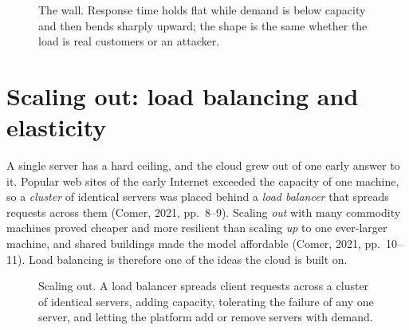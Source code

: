 \begin{figure}[htbp]
\centering
{}
\caption{The wall. Response time holds flat while demand is below capacity and
then bends sharply upward; the shape is the same whether the load is real
customers or an attacker.}
\label{fig:wall}
\end{figure}

\section{Scaling out: load balancing and elasticity}

A single server has a hard ceiling, and the cloud grew out of one early
answer to it. Popular web sites of the early Internet exceeded the capacity
of one machine, so a \emph{cluster} of identical servers was placed behind a
\emph{load balancer} that spreads requests across them (Comer, 2021,
pp.~8--9). Scaling \emph{out} with many commodity machines proved cheaper and
more resilient than scaling \emph{up} to one ever-larger machine, and shared
buildings made the model affordable (Comer, 2021, pp.~10--11). Load
balancing is therefore one of the ideas the cloud is built on.

\begin{figure}[htbp]
\centering
{}
\caption{Scaling out. A load balancer spreads client requests across a cluster
of identical servers, adding capacity, tolerating the failure of any one
server, and letting the platform add or remove servers with demand.}
\label{fig:loadbalancer}
\end{figure}

